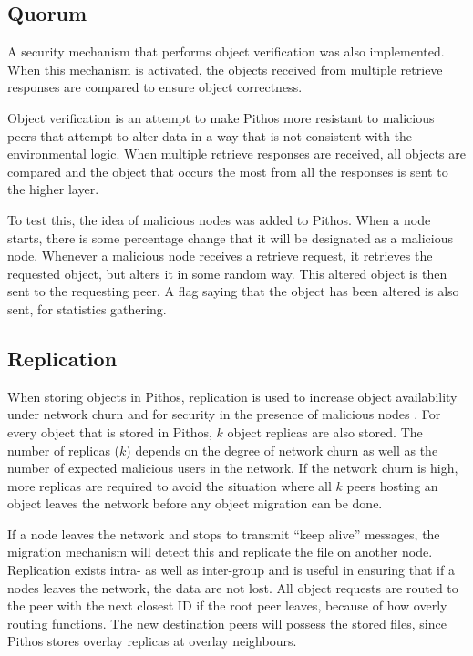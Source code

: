 \subsection{Quorum}
A security mechanism that performs object verification was also implemented. When this mechanism is activated, the objects received from multiple retrieve responses are compared to ensure object correctness.

Object verification is an attempt to make Pithos more resistant to malicious peers that attempt to alter data in a way that is not consistent with the environmental logic. When multiple retrieve responses are received, all objects are compared and the object that occurs the most from all the responses is sent to the higher layer.

To test this, the idea of malicious nodes was added to Pithos. When a node starts, there is some percentage change that it will be designated as a malicious node. Whenever a malicious node receives a retrieve request, it retrieves the requested object, but alters it in some random way. This altered object is then sent to the requesting peer. A flag saying that the object has been altered is also sent, for statistics gathering.

\subsection{Replication}
When storing objects in Pithos, replication is used to increase object availability under network churn and for security in the presence of malicious nodes \cite{storage_and_chaching_PAST}. For every object that is stored in Pithos, $k$ object replicas are also stored. The number of replicas ($k$) depends on the degree of network churn as well as the number of expected malicious users in the network. If the network churn is high, more replicas are required to avoid the situation where all $k$ peers hosting an object leaves the network before any object migration can be done.

If a node leaves the network and stops to transmit ``keep alive'' messages, the migration mechanism will detect this and replicate the file on another node. Replication exists intra- as well as inter-group and is useful in ensuring that if a nodes leaves the network, the data are not lost. All object requests are routed to the peer with the next closest ID if the root peer leaves, because of how overly routing functions. The new destination peers will possess the stored files, since Pithos stores overlay replicas at overlay neighbours.


